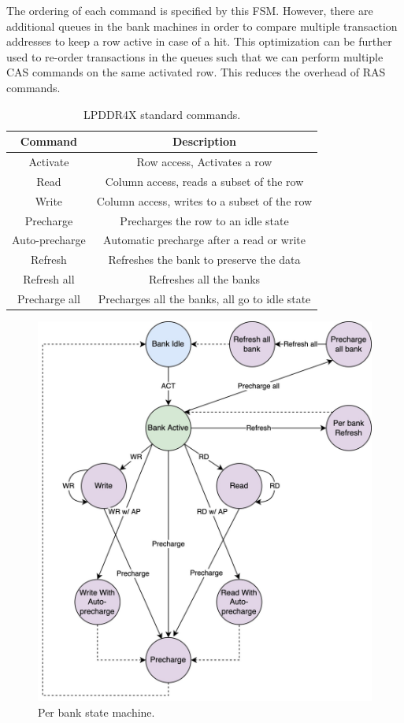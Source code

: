 The ordering of each command is specified by this FSM. However, there are additional queues in the bank machines in order to compare multiple transaction addresses to keep a row active in case of a hit. This optimization can be further used to re-order transactions in the queues such that we can perform multiple CAS commands on the same activated row. This reduces the overhead of RAS commands. 
\begin{table}
    \centering
    \begin{tabular}{c|c}
        Command & Description \\
        \hline
        Activate & Row access, Activates a row\\
        Read & Column access, reads a subset of the row\\
        Write & Column access, writes to a subset of the row\\
        Precharge & Precharges the row to an idle state\\
        Auto-precharge & Automatic precharge after a read or write\\
        Refresh & Refreshes the bank to preserve the data\\
        Refresh all & Refreshes all the banks\\
        Precharge all & Precharges all the banks, all go to idle state
    \end{tabular}
    \caption{LPDDR4X standard commands.}
    \label{tab:cmd}
\end{table}

\begin{figure}
    \centering
    \includegraphics[scale=0.2]{images/fsm.jpg}
    \caption{Per bank state machine.}
    \label{fig:fsm}
\end{figure}


